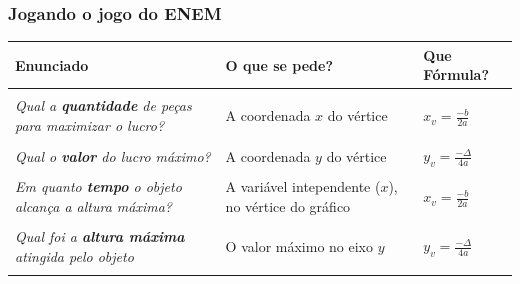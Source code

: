 \documentclass[aspectratio=169, t, 8pt]{beamer}
\begin{document}
    \begin{frame}
        \frametitle{Jogando o jogo do ENEM}
        \begin{table}
            \centering
            \setlength{\tabcolsep}{0.07\textwidth}
            \begin{tabular}{p{} p{} p{}}
                \textbf{Enunciado} & \textbf{O que se pede?} & \textbf{Que Fórmula?}\\
                
                \hline\\
                
                \textit{Qual a \textbf{quantidade} de peças para maximizar o lucro?} & A coordenada $x$ do vértice & $x_v = \frac{-b}{2a}$
                \vspace{0.8cm}\\
                
                \hline\\

                \textit{Qual o \textbf{valor} do lucro máximo?} & A coordenada $y$ do vértice & $y_v = \frac{-\Delta}{4a}$
                \vspace{0.8cm}\\
                
                \hline\\

                \textit{Em quanto \textbf{tempo} o objeto alcança a altura máxima?} & A variável intependente ($x$), no vértice do gráfico & $x_v = \frac{-b}{2a}$
                \vspace{0.8cm}\\
                
                \hline\\

                \textit{Qual foi a \textbf{altura máxima} atingida pelo objeto} & O valor máximo no eixo $y$ & $\displaystyle y_v = \frac{-\Delta}{4a}$
                \vspace{0.8cm}\\
                
                \hline\\
            \end{tabular}
        \end{table}
    \end{frame}
\end{document}
